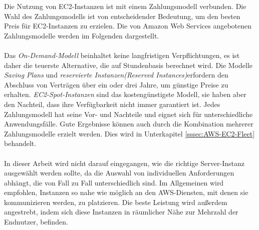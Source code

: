 Die Nutzung von EC2-Instanzen ist mit einem Zahlungsmodell verbunden. Die Wahl des Zahlungsmodells ist von entscheidender Bedeutung, um den besten Preis für EC2-Instanzen zu erzielen.
Die von Amazon Web Services angebotenen Zahlungsmodelle werden im Folgenden dargestellt.
\\\\
Das \textit{On-Demand-Modell} beinhaltet keine langfristigen Verpflichtungen, es ist daher die teuerste Alternative, die auf Stundenbasis berechnet wird. Die Modelle \textit{Saving Plans} und \textit{reservierte Instanzen(Reserved Instances)}erfordern den Abschluss von Verträgen über ein oder drei Jahre, um günstige Preise zu erhalten. \textit{EC2-Spot-Instanzen} sind das kostengünstigste Modell, sie haben aber den Nachteil, dass ihre Verfügbarkeit nicht immer garantiert ist. Jedes Zahlungsmodell hat seine Vor- und Nachteile und eignet sich für unterschiedliche Anwendungsfälle. Gute Ergebnisse können auch durch die Kombination mehrerer Zahlungsmodelle erzielt werden. %
Dies wird in Unterkapitel \ref{sssec:AWS-EC2-Fleet} behandelt.
\\\\
In dieser Arbeit wird nicht darauf eingegangen, wie die richtige Server-Instanz ausgewählt werden sollte, da die Auswahl von individuellen Anforderungen abhängt, die von Fall zu Fall unterschiedlich sind. Im Allgemeinen wird empfohlen, Instanzen so nahe wie möglich an den AWS-Diensten, mit denen sie kommunizieren werden, zu platzieren. %
Die beste Leistung wird außerdem angestrebt, indem sich diese Instanzen in räumlicher Nähe zur Mehrzahl der Endnutzer, befinden. 
